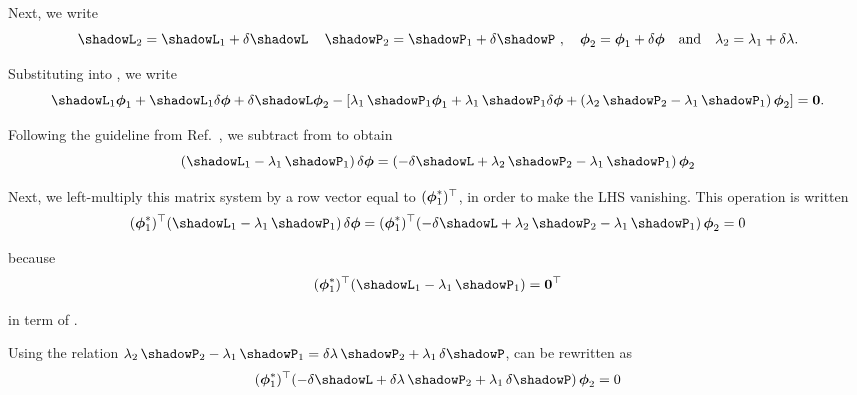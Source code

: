 \vskip 0.08cm

Next, we write
\begin{equation}
\shadowL_2 = \shadowL_1+\delta\shadowL \, \ \ \ \shadowP_2 = \shadowP_1+\delta\shadowP \ , \ \ \  \bff(\phi)_2=\bff(\phi)_1+\delta\bff(\phi) \ \ \ {\rm and} \ \ \ \lambda_2=\lambda_1+\delta\lambda .
\label{eq:duo3}
\end{equation}

\vskip 0.08cm

Substituting  into , we write
\begin{equation}
\shadowL_1 \bff(\phi)_1+\shadowL_1 \delta\bff(\phi)+\delta\shadowL \bff(\phi)_2-\left[\lambda_1 \, \shadowP_1 \bff(\phi)_1+\lambda_1 \, \shadowP_1 \delta\bff(\phi)+(\lambda_2 \, \shadowP_2-\lambda_1 \, \shadowP_1) \, \bff(\phi)_2\right]=\bff(0) .
\label{eq:duo4}
\end{equation}

\vskip 0.08cm

Following the guideline from Ref.~, we subtract  from  to obtain
\begin{equation}
(\shadowL_1-\lambda_1 \, \shadowP_1) \, \delta\bff(\phi)=(-\delta\shadowL +\lambda_2 \, \shadowP_2-\lambda_1 \, \shadowP_1) \, \bff(\phi)_2
\label{eq:duo5}
\end{equation}

\vskip 0.08cm

Next, we left-multiply this matrix system by a row vector equal to $(\bff(\phi)^*_1)^\top$, in order to make the LHS vanishing. This operation is written
\begin{equation}
(\bff(\phi)^*_1)^\top(\shadowL_1-\lambda_1 \, \shadowP_1) \, \delta\bff(\phi)=(\bff(\phi)^*_1)^\top(-\delta\shadowL +\lambda_2 \, \shadowP_2-\lambda_1 \, \shadowP_1) \, \bff(\phi)_2=0
\label{eq:duo6}
\end{equation}

\noindent because
\begin{equation}
(\bff(\phi)^*_1)^\top(\shadowL_1-\lambda_1 \, \shadowP_1) =\bff(0)^\top
\label{eq:duo7}
\end{equation}

\noindent in term of .

\vskip 0.08cm

Using the relation $\lambda_2 \, \shadowP_2-\lambda_1 \, \shadowP_1=\delta\lambda\, \shadowP_2+\lambda_1 \, \delta\shadowP$, 
can be rewritten as
\begin{equation}
(\bff(\phi)^*_1)^\top(-\delta\shadowL +\delta\lambda\, \shadowP_2+\lambda_1 \, \delta\shadowP) \, \bff(\phi)_2=0
\label{eq:duo8}
\end{equation}

